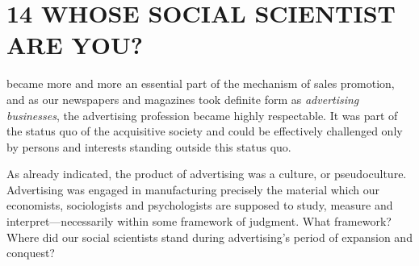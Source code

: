 \documentclass[twoside,nohyper,openany,nobib]{tufte-book}
\let\oldchapter\chapter
\def\chapter{%
  \setcounter{footnote}{0}%
  \oldchapter
}
\begin{document}
\chapter[14 \hspace*{1mm} WHOSE SOCIAL SCIENTIST ARE YOU?]{14 WHOSE SOCIAL SCIENTIST ARE YOU?}

 became more and more an essential part of the mechanism
of sales promotion, and as our newspapers and magazines took definite
form as \emph{advertising businesses}, the advertising profession became
highly respectable. It was part of the status quo of the acquisitive
society and could be effectively challenged only by persons and
interests standing outside this status quo.

As already indicated, the product of advertising was a culture, or
pseudoculture. Advertising was engaged in manufacturing precisely the
material which our economists, sociologists and psychologists are
supposed to study, measure and interpret---necessarily within some
framework of judgment. What framework? Where did our social scientists
stand during advertising's period of expansion and conquest?
\end{document}
